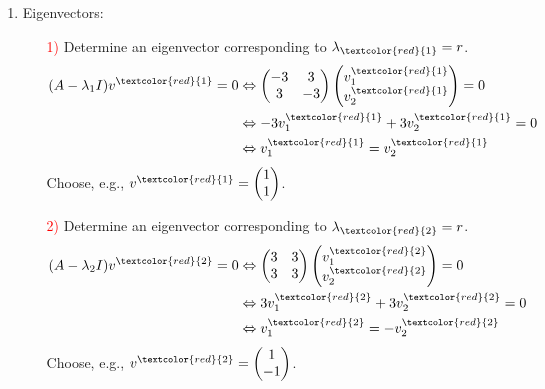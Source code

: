 {\begin{enumerate}
\begin{enumerate}
	$\Leftrightarrow~~(2-\lambda)^2 = 9~~ \Leftrightarrow~~2-\lambda = \pm 3~~ \Leftrightarrow~~\lambda = 2\pm 3~~ (\lambda_1:=5, \lambda_2:=-1)$\\
	Set $$\Lambda:=\text{diag}(\lambda_1,\lambda_2)=\begin{pmatrix}5&0\\0&-1\end{pmatrix}.$$
	\item Eigenvectors:\\
	\begin{enumerate}
		\item[\textcolor{red}{1)}] 
		Determine an eigenvector corresponding to $\lambda_{\textcolor{red}{1}}=r$.
		\begin{align*}
		(A-\lambda_1 I)v^{\textcolor{red}{1}}=0 &\Leftrightarrow \begin{pmatrix}-3&3\\3&-3\end{pmatrix}\begin{pmatrix}v_1^{\textcolor{red}{1}}\\v_2^{\textcolor{red}{1}}\end{pmatrix}=0\\
		&\Leftrightarrow -3v_1^{\textcolor{red}{1}}+3v_2^{\textcolor{red}{1}} =0\\
		&\Leftrightarrow v_1^{\textcolor{red}{1}} = v_2^{\textcolor{red}{1}}
		\end{align*}
		Choose, e.g., $v^{\textcolor{red}{1}} = \begin{pmatrix}1\\1\end{pmatrix}$.
		\item[\textcolor{red}{2)}] 
		Determine an eigenvector corresponding to $\lambda_{\textcolor{red}{2}}=r$.
		\begin{align*}
		(A-\lambda_2 I)v^{\textcolor{red}{2}}=0 &\Leftrightarrow \begin{pmatrix}3&3\\3&3\end{pmatrix}\begin{pmatrix}v_1^{\textcolor{red}{2}}\\v_2^{\textcolor{red}{2}}\end{pmatrix}=0\\
		&\Leftrightarrow 3v_1^{\textcolor{red}{2}}+3v_2^{\textcolor{red}{2}} =0\\
		&\Leftrightarrow v_1^{\textcolor{red}{2}} =- v_2^{\textcolor{red}{2}}
		\end{align*}
		Choose, e.g., $v^{\textcolor{red}{2}} = \begin{pmatrix}1\\-1\end{pmatrix}$.

\end{enumerate}
\end{enumerate}
\end{enumerate}}
